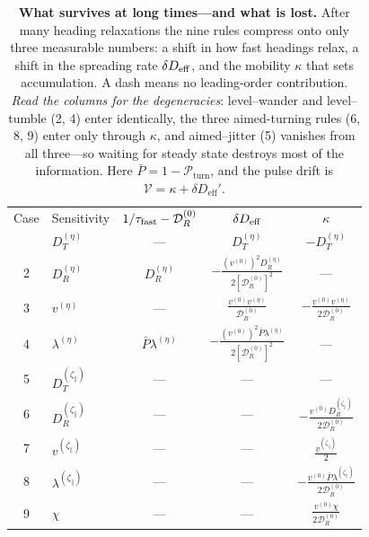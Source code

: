 \documentclass[
  reprint,
  superscriptaddress,
  amsmath,
  amssymb,
  aps,
  pre,
  nofootinbib,
  floatfix
]{revtex4-2}
\newcommand{\Pturn}{\mathcal P_{\mathrm{turn}}}
\newcommand{\DR}{\mathcal D_R^{(0)}}
\newcommand{\zp}{\zeta_\parallel}
\begin{document}
\begin{table}[t]
\caption{\textbf{What survives at long times---and what is lost.}  After many
heading relaxations the nine rules compress onto only three measurable
numbers: a shift in how fast headings relax, a shift in the spreading rate
$\delta D_{\rm eff}$, and the mobility $\kappa$ that sets accumulation.  A
dash means no leading-order contribution.  \emph{Read the columns for the
degeneracies}: level--wander and level--tumble (2, 4) enter identically, the
three aimed-turning rules (6, 8, 9) enter only through $\kappa$, and
aimed--jitter (5) vanishes from all three---so waiting for steady state
destroys most of the information.  Here $\bar P=1-\Pturn$, and the pulse drift
is $\mathcal V=\kappa+\delta D_{\mathrm{eff}}'$.}
\label{tab:mode-inversion}
\footnotesize
\begin{ruledtabular}
\begin{tabular}{clccc}
Case & Sensitivity & $1/\tau_{\rm fast}-\DR$ & $\delta D_{\rm eff}$ & $\kappa$\\
\colrule
1 & $D_T^{(\eta)}$ & --- & $D_T^{(\eta)}$ & $-D_T^{(\eta)}$\\
2 & $D_R^{(\eta)}$ & $D_R^{(\eta)}$ & $-\frac{(v^{(0)})^2D_R^{(\eta)}}{2[\DR]^2}$ & ---\\
3 & $v^{(\eta)}$ & --- & $\frac{v^{(0)}v^{(\eta)}}{\DR}$ & $-\frac{v^{(0)}v^{(\eta)}}{2\DR}$\\
4 & $\lambda^{(\eta)}$ & $\bar P\lambda^{(\eta)}$ & $-\frac{(v^{(0)})^2\bar P\lambda^{(\eta)}}{2[\DR]^2}$ & ---\\
5 & $D_T^{(\zp)}$ & --- & --- & ---\\
6 & $D_R^{(\zp)}$ & --- & --- & $-\frac{v^{(0)}D_R^{(\zp)}}{2\DR}$\\
7 & $v^{(\zp)}$ & --- & --- & $\frac{v^{(\zp)}}{2}$\\
8 & $\lambda^{(\zp)}$ & --- & --- & $-\frac{v^{(0)}\bar P\lambda^{(\zp)}}{2\DR}$\\
9 & $\chi$ & --- & --- & $\frac{v^{(0)}\chi}{2\DR}$\\
\end{tabular}
\end{ruledtabular}
\end{table}
\end{document}
